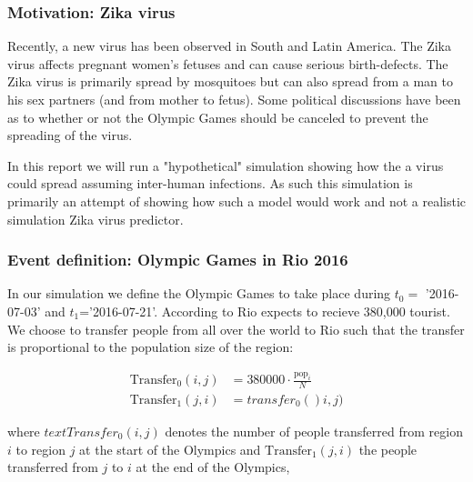 \subsubsection{Motivation: Zika virus}
Recently, a new virus has been observed in South and Latin America. The Zika virus affects pregnant women's fetuses and can cause serious birth-defects. The Zika virus is primarily spread by mosquitoes but can also spread from a man to his sex partners (and from mother to fetus). Some political discussions have been as to whether or not the Olympic Games should be canceled to prevent the spreading of the virus. 

In this report we will run a "hypothetical" simulation showing how the a virus could spread assuming inter-human infections. As such this simulation is primarily an attempt of showing how such a model would work and not a realistic simulation Zika virus predictor.

\subsubsection{Event definition: Olympic Games in Rio 2016}
In our simulation we define the Olympic Games to take place during $t_0=$ '2016-07-03' and $t_1$='2016-07-21'. According to \cite{theguardian-olympics} Rio expects to recieve 380,000 tourist. We choose to transfer people from all over the world to Rio such that the transfer is proportional to the population size of the region:

\begin{align}
	\text{Transfer}_0(i, j) &= 380000 \cdot \frac{ \text{pop}_i}{N} \\
	\text{Transfer}_1(j, i) &= transfer_0()i, j)
\end{align}

where $text{Transfer}_0(i, j) $ denotes the number of people transferred from region $i$ to region $j$ at the start of the Olympics and $ \text{Transfer}_1(j, i) $ the people transferred from $j$ to $i$ at the end of the Olympics,